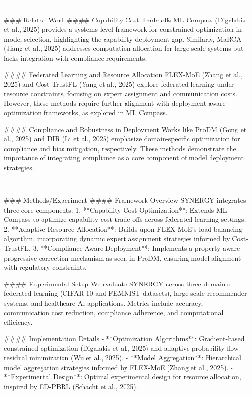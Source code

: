 ---

### Related Work  
#### Capability-Cost Trade-offs  
ML Compass (Digalakis et al., 2025) provides a systems-level framework for constrained optimization in model selection, highlighting the capability-deployment gap. Similarly, MaRCA (Jiang et al., 2025) addresses computation allocation for large-scale systems but lacks integration with compliance requirements.  

#### Federated Learning and Resource Allocation  
FLEX-MoE (Zhang et al., 2025) and Cost-TrustFL (Yang et al., 2025) explore federated learning under resource constraints, focusing on expert assignment and communication costs. However, these methods require further alignment with deployment-aware optimization frameworks, as explored in ML Compass.  

#### Compliance and Robustness in Deployment  
Works like ProDM (Gong et al., 2025) and DIR (Li et al., 2025) emphasize domain-specific optimization for compliance and bias mitigation, respectively. These methods demonstrate the importance of integrating compliance as a core component of model deployment strategies.  

---

### Methods/Experiment  
#### Framework Overview  
SYNERGY integrates three core components:  
1. **Capability-Cost Optimization**: Extends ML Compass to optimize capability-cost trade-offs across federated learning settings.  
2. **Adaptive Resource Allocation**: Builds upon FLEX-MoE’s load balancing algorithm, incorporating dynamic expert assignment strategies informed by Cost-TrustFL.  
3. **Compliance-Aware Deployment**: Implements a property-aware progressive correction mechanism as seen in ProDM, ensuring model alignment with regulatory constraints.  

#### Experimental Setup  
We evaluate SYNERGY across three domains: federated learning (CIFAR-10 and FEMNIST datasets), large-scale recommender systems, and healthcare AI applications. Metrics include accuracy, communication cost reduction, compliance adherence, and computational efficiency.  

#### Implementation Details  
- **Optimization Algorithms**: Gradient-based constrained optimization (Digalakis et al., 2025) and adaptive probability flow residual minimization (Wu et al., 2025).  
- **Model Aggregation**: Hierarchical model aggregation strategies informed by FLEX-MoE (Zhang et al., 2025).  
- **Experimental Design**: Optimal experimental design for resource allocation, inspired by ED-PBRL (Schacht et al., 2025).

